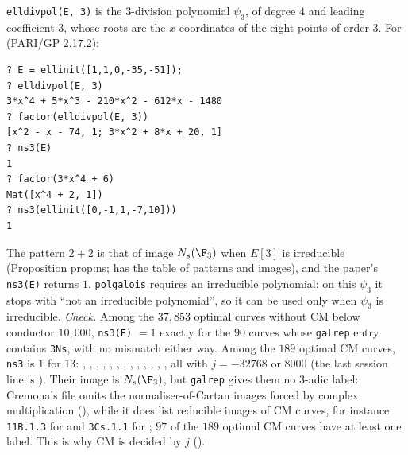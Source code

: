 \begin{sloppypar}
\begin{example}\label{ex:computation:mod3-image}
\texttt{elldivpol(E, 3)} is the $3$-division polynomial $\psi_3$, of degree $4$ and leading coefficient $3$, whose roots are the $x$-coordinates of the
eight points of order $3$. For  (PARI/GP 2.17.2):
\begin{lstlisting}[language=GP]
? E = ellinit([1,1,0,-35,-51]);
? elldivpol(E, 3)
3*x^4 + 5*x^3 - 210*x^2 - 612*x - 1480
? factor(elldivpol(E, 3))
[x^2 - x - 74, 1; 3*x^2 + 8*x + 20, 1]
? ns3(E)
1
? factor(3*x^4 + 6)
Mat([x^4 + 2, 1])
? ns3(ellinit([0,-1,1,-7,10]))
1
\end{lstlisting}
The pattern $2+2$ is that of image $N_s(\F_3)$ when $E[3]$ is irreducible (Proposition prop:ns;  has the table of patterns and
images), and the paper's \texttt{ns3(E)} returns $1$. \texttt{polgalois} requires an irreducible polynomial: on this $\psi_3$ it stops with ``not
an irreducible polynomial'', so it can be used only when $\psi_3$ is irreducible. \emph{Check.} Among the $37{,}853$ optimal curves without CM below
conductor $10{,}000$, \texttt{ns3(E)} $=1$ exactly for the $90$ curves whose \texttt{galrep} entry contains \texttt{3Ns}, with no mismatch either way.
Among the $189$ optimal CM curves, \texttt{ns3} is $1$ for $13$: , , , , , ,
, , , , , , , all with $j=-32768$ or $8000$ (the last session line is
). Their image is $N_s(\F_3)$, but \texttt{galrep} gives them no $3$-adic label: Cremona's file omits the normaliser-of-Cartan images
forced by complex multiplication (), while it does list reducible images of CM curves, for instance \texttt{11B.1.3} for 
and \texttt{3Cs.1.1} for ; $97$ of the $189$ optimal CM curves have at least one label. This is why CM is decided by $j$ ().
\end{example}


\end{sloppypar}
